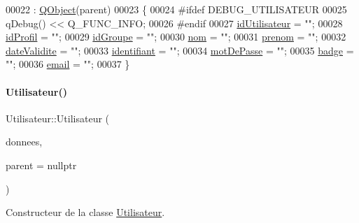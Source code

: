 \begin{DoxyCode}
00022                                         : \hyperlink{class_q_object}{QObject}(parent)
00023 \{
00024 \textcolor{preprocessor}{    #ifdef DEBUG\_UTILISATEUR}
00025         qDebug() << Q\_FUNC\_INFO;
00026 \textcolor{preprocessor}{    #endif}
00027     \hyperlink{class_utilisateur_ae1763e7a52c82c63506bc4160cdabb20}{idUtilisateur} = \textcolor{stringliteral}{""};
00028     \hyperlink{class_utilisateur_a042947e8b86637d1eb012c3fc89a959e}{idProfil} = \textcolor{stringliteral}{""};
00029     \hyperlink{class_utilisateur_a13c3425772da1d5501e6fe4a2f2b8194}{idGroupe} = \textcolor{stringliteral}{""};
00030     \hyperlink{class_utilisateur_a1096e809aca4b7cf453a7af93cb72502}{nom} = \textcolor{stringliteral}{""};
00031     \hyperlink{class_utilisateur_a1dd0779807b19298f30f39d9c371170f}{prenom} = \textcolor{stringliteral}{""};
00032     \hyperlink{class_utilisateur_a898cd6f5a64d733ad49a8a74388326cd}{dateValidite} = \textcolor{stringliteral}{""};
00033     \hyperlink{class_utilisateur_a1e79e47202a2c716346f47adbbeb2511}{identifiant} = \textcolor{stringliteral}{""};
00034     \hyperlink{class_utilisateur_a4f6a17d0fb5c231bcb414396236a056f}{motDePasse} = \textcolor{stringliteral}{""};
00035     \hyperlink{class_utilisateur_a77b48aa9d1f0ec04c69d45476897fec6}{badge} = \textcolor{stringliteral}{""};
00036     \hyperlink{class_utilisateur_a2f45443ce5277a5e6baefe5121e66555}{email} = \textcolor{stringliteral}{""};
00037 \}
\end{DoxyCode}
\mbox{\label{class_utilisateur_a6bfd9ef83e910946f3cf3b6e0fcca343}} 
\paragraph{\texorpdfstring{Utilisateur()}{Utilisateur()}\hspace{0.1cm}{\footnotesize\ttfamily [2/2]}}
{\footnotesize\ttfamily Utilisateur\+::\+Utilisateur (\begin{DoxyParamCaption}\item[{Q\+String\+List}]{donnees,  }\item[{\hyperlink{class_q_object}{Q\+Object} $\ast$}]{parent = {\ttfamily nullptr} }\end{DoxyParamCaption})}



Constructeur de la classe \hyperlink{class_utilisateur}{Utilisateur}. 

